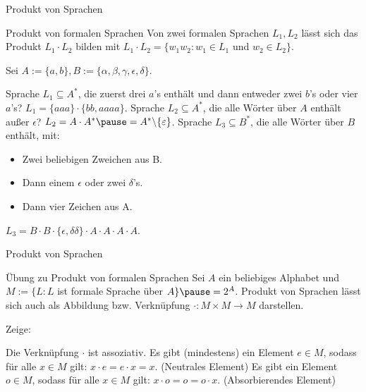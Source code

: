 \documentclass{beamer}
\begin{document}
\begin{frame}{Produkt von Sprachen}
	\begin{block}{Produkt von formalen Sprachen}
		Von zwei formalen Sprachen $L_1, L_2$ lässt sich das Produkt $L_1 \cdot L_2$ bilden mit \pause $L_1 \cdot L_2 = \{w_1w_2 : w_1 \in L_1 $ und $w_2 \in L_2 \}$.
	\end{block}

	Sei $A := \{a, b\}, B := \{\alpha, \beta, \gamma, \epsilon, \delta\}$.
	
	\begin{itemize}
		\pitem Sprache $L_1 \subseteq A^*$, die zuerst drei $a$'s enthält und dann entweder zwei $b$'s oder vier $a$'s? \pause $L_1 = \{aaa\}\cdot\{bb,aaaa\}$.
		\pitem Sprache $L_2 \subseteq A^*$, die alle Wörter über $A$ enthält außer $\epsilon$? \pause $L_2 = A \cdot A^* \pause = A^* \backslash \{\epsilon\}$.
		\pitem Sprache $L_3 \subseteq B^*$, die alle Wörter über $B$ enthält, mit:
		\begin{itemize}
			\p\item Zwei beliebigen Zweichen aus B.
			\p\item Dann einem $\epsilon$ oder zwei $\delta$'s.
			\p\item Dann vier Zeichen aus A.
		\end{itemize}
		\pitem $L_3 = B \cdot B \cdot \{\epsilon, \delta\delta\} \cdot A \cdot A \cdot A \cdot A$.
	\end{itemize}
\end{frame}

\begin{frame}{Produkt von Sprachen}	
	\begin{taskblock}{Übung zu Produkt von formalen Sprachen}
		Sei $A$ ein beliebiges Alphabet und $M := \{L : L $ ist formale Sprache über $A \} \pause = 2^A$. \pause Produkt von Sprachen lässt sich auch als Abbildung bzw. Verknüpfung $\cdot : M \times M \rightarrow M$ darstellen.
		
		Zeige: 
		\begin{itemize}
			\pitem Die Verknüpfung $\cdot$ ist assoziativ.
			\pitem Es gibt (mindestens) ein Element $e \in M$, sodass für alle $x \in M$ gilt: $x \cdot e = e \cdot x = x$. (Neutrales Element)
			\pitem Es gibt ein Element $o \in M$, sodass für alle $x \in M$ gilt: $x \cdot o = o = o \cdot x$. (Absorbierendes Element)
		\end{itemize}
	\end{taskblock}
\end{frame}
\end{document}
